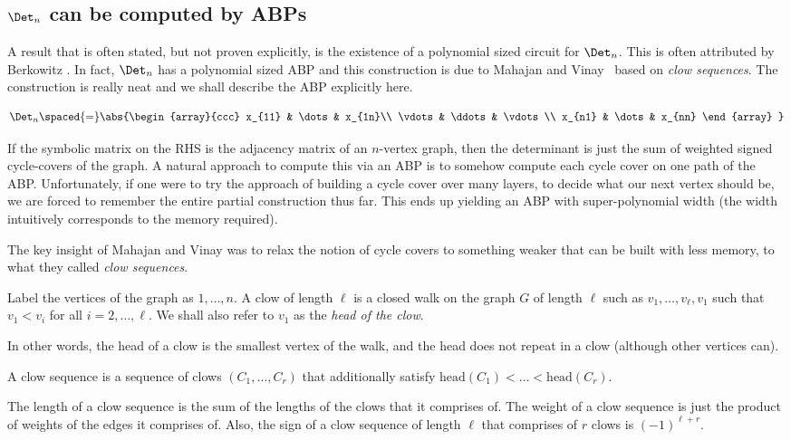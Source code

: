 \subsection{$\Det_n$ can be computed by ABPs}

A result that is often stated, but not proven explicitly, is the existence of a polynomial sized circuit for $\Det_n$.
This is often attributed by Berkowitz \cite{Berk84}.
In fact, $\Det_n$ has a polynomial sized ABP and this construction is due to Mahajan and Vinay~\cite{mv97} based on \emph{clow sequences}.
The construction is really neat and we shall describe the ABP explicitly here.

\[
\Det_n \spaced{=} \abs{\begin{array}{ccc}
x_{11} & \dots & x_{1n}\\
\vdots & \ddots & \vdots \\
x_{n1} & \dots & x_{nn}
\end{array}
}\]

If the symbolic matrix on the RHS is the adjacency matrix of an $n$-vertex graph, then the determinant is just the sum of weighted signed cycle-covers of the graph.
A natural approach to compute this via an ABP is to somehow compute each cycle cover on one path of the ABP.
Unfortunately, if one were to try the \naive approach of building a cycle cover over many layers, to decide what our next vertex should be, we are forced to remember the entire partial construction thus far.
This ends up yielding an ABP with super-polynomial width (the width intuitively corresponds to the memory required).

The key insight of Mahajan and Vinay was to relax the notion of cycle covers to something weaker that can be built with less memory, to what they called \emph{clow sequences}.

\begin{definition}
Label the vertices of the graph as $1,\dots, n$.
A clow  of length $\ell$ is a closed walk on the graph $G$ of length $\ell$ such as $v_1,\dots, v_\ell,v_1$ such that $v_1 < v_i$ for all $i=2,\dots, \ell$.
We shall also refer to $v_1$ as the \emph{head of the clow}.

In other words, the head of a clow is the smallest vertex of the walk, and the head does not repeat in a clow (although other vertices can).

A clow sequence is a sequence of clows $(C_1,\dots, C_r)$ that additionally satisfy $\mathrm{head}(C_1) < \dots < \mathrm{head}(C_r)$.

The length of a clow sequence is the sum of the lengths of the clows that it comprises of.
The weight of a clow sequence is just the product of weights of the edges it comprises of.
Also, the sign of a clow sequence of length $\ell$ that comprises of $r$ clows is $(-1)^{\ell + r}$.
\end{definition}

